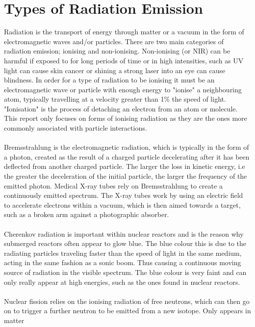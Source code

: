 \documentclass[12pt,a4paper]{article}
\begin{document}
\section{Types of Radiation Emission }
\label{radd}
Radiation is the transport of energy through matter or a vacuum in the form of electromagnetic waves and/or particles. There are two main categories of radiation emission; ionising and non-ionising. Non-ionising (or NIR) can be harmful if exposed to for long periods of time or in high intensities, such as UV light can cause skin cancer or shining a strong laser into an eye can cause blindness. In order for a type of radiation to be ionising it must be an electromagnetic wave or particle with enough energy to "ionise" a neighbouring atom, typically travelling at a velocity greater than 1\% the speed of light.  "Ionisation" is the process of detaching an electron from an atom or molecule. This report only focuses on forms of ionising radiation as they are the ones more commonly associated with particle interactions. 
\\\\ 
\noindent Bremsstrahlung is the electromagnetic radiation, which is typically in the form of a photon, created as the result of a charged particle decelerating after it has been deflected from another charged particle. The larger the loss in kinetic energy, i.e the greater the deceleration of the initial particle, the larger the frequency of the emitted photon. Medical X-ray tubes rely on Bremsstrahlung to create a continuously emitted spectrum. The X-ray tubes work by using an electric field to accelerate electrons within a vacuum, which is then aimed towards a target, such as a broken arm against a photographic absorber.
\\\\
\noindent Cherenkov radiation is important within nuclear reactors and is the reason why submerged reactors often appear to glow blue. The blue colour this is due to the radiating particles traveling faster than the speed of light in the same medium, acting in the same fashion as a sonic boom. Thus causing a continuous moving source of radiation in the visible spectrum. The blue colour is very faint and can only really appear at high energies, such as the ones found in nuclear reactors. 
\\\\
\noindent Nuclear fission relies on the ionising radiation of free neutrons, which can then go on to trigger a further neutron to be emitted from a new isotope. Only appears in matter
\end{document}
